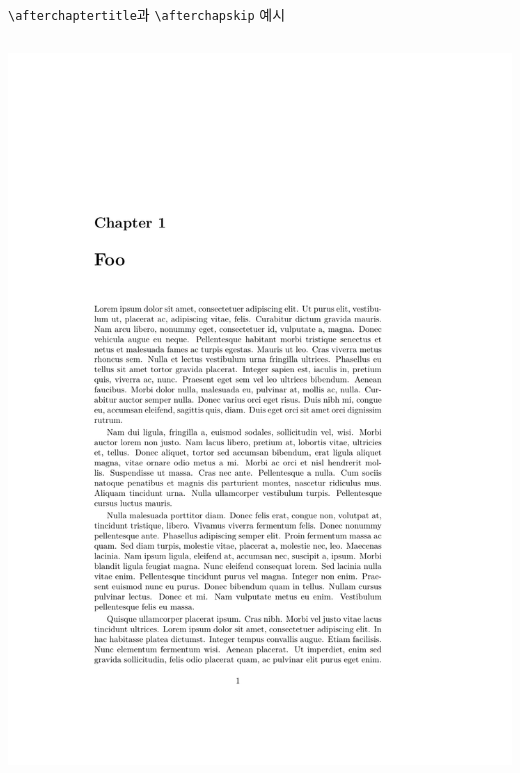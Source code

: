 \documentclass{beamer}
\def\tbs{\textbackslash}
\begin{document}
\begin{frame}[fragile]
  {\texttt{\tbs afterchaptertitle}과 \texttt{\tbs afterchapskip} 예시}
  \begin{overprint}
    \begin{columns}
      \begin{column}{0.5\textwidth}
        \begin{latexcode}
          \setlength\afterchapskip{40pt}
        \end{latexcode}
        \begin{center}
          \includegraphics[frame,page=1,width=0.8\linewidth]{afterchaptertitle}
        \end{center}
      \end{column}


\end{columns}
\end{overprint}
\end{frame}
\end{document}
